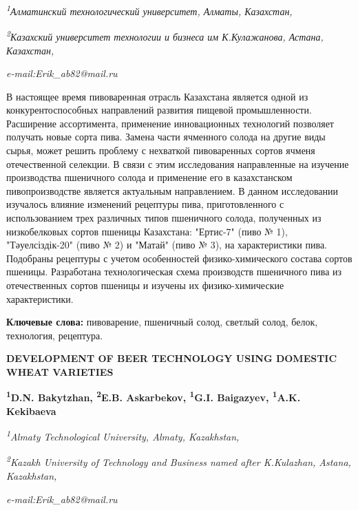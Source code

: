 \begin{affiliation}
\emph{\textsuperscript{1}Алматинский технологический университет, Алматы, Казахстан,}

\emph{\textsuperscript{2}Казахский университет технологии и бизнеса им К.Кулажанова, Астана, Казахстан,}

\emph{e-mail:Erik\_ab82@mail.ru}
\end{affiliation}

В настоящее время пивоваренная отрасль Казахстана является одной из
конкурентоспособных направлений развития пищевой промышленности.
Расширение ассортимента, применение инновационных технологий позволяет
получать новые сорта пива. Замена части ячменного солода на другие виды
сырья, может решить проблему с нехваткой пивоваренных сортов ячменя
отечественной селекции. В связи с этим исследования направленные на
изучение производства пшеничного солода и применение его в казахстанском
пивопроизводстве является актуальным направлением. В данном исследовании
изучалось влияние изменений рецептуры пива, приготовленного с
использованием трех различных типов пшеничного солода, полученных из
низкобелковых сортов пшеницы Казахстана: "Ертис-7" (пиво № 1),
"Тәуелсіздік-20" (пиво № 2) и "Матай" (пиво № 3), на характеристики
пива. Подобраны рецептуры с учетом особенностей физико-химического
состава сортов пшеницы. Разработана технологическая схема производств
пшеничного пива из отечественных сортов пшеницы и изучены их
физико-химические характеристики.

{\bfseries Ключевые слова:} пивоварение, пшеничный солод, светлый солод,
белок, технология, рецептура.

\begin{articleheader}
{\bfseries DEVELOPMENT OF BEER TECHNOLOGY USING DOMESTIC WHEAT VARIETIES}

{\bfseries
\textsuperscript{1}D.N. Bakytzhan,
\textsuperscript{2}E.B. Askarbekov\textsuperscript{\envelope },
\textsuperscript{1}G.I. Baigazyev,
\textsuperscript{1}A.K. Kekibaeva}
\end{articleheader}

\begin{affiliation}
\emph{\textsuperscript{1}Almaty Technological University, Almaty, Kazakhstan,}

\emph{\textsuperscript{2}Kazakh University of Technology and Business named after K.Kulazhan, Astana, Kazakhstan,}

\emph{e-mail:Erik\_ab82@mail.ru}
\end{affiliation}


